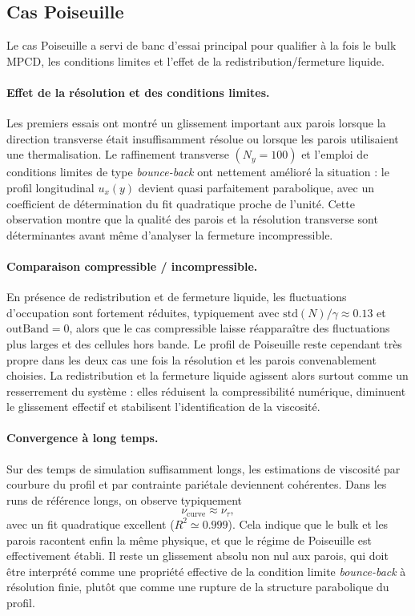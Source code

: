 \documentclass[11pt,a4paper]{article}
\begin{document}
\subsection{Cas Poiseuille}

Le cas Poiseuille a servi de banc d'essai principal pour qualifier à la fois le bulk MPCD, les conditions limites et l'effet de la redistribution/fermeture liquide.

\paragraph{Effet de la résolution et des conditions limites.}
Les premiers essais ont montré un glissement important aux parois lorsque la direction transverse était insuffisamment résolue ou lorsque les parois utilisaient une thermalisation. Le raffinement transverse \((N_y=100)\) et l'emploi de conditions limites de type \emph{bounce-back} ont nettement amélioré la situation : le profil longitudinal \(u_x(y)\) devient quasi parfaitement parabolique, avec un coefficient de détermination du fit quadratique proche de l'unité. Cette observation montre que la qualité des parois et la résolution transverse sont déterminantes avant même d'analyser la fermeture incompressible.

\paragraph{Comparaison compressible / incompressible.}
En présence de redistribution et de fermeture liquide, les fluctuations d'occupation sont fortement réduites, typiquement avec \(\mathrm{std}(N)/\gamma \approx 0.13\) et \(\mathrm{outBand}=0\), alors que le cas compressible laisse réapparaître des fluctuations plus larges et des cellules hors bande. Le profil de Poiseuille reste cependant très propre dans les deux cas une fois la résolution et les parois convenablement choisies. La redistribution et la fermeture liquide agissent alors surtout comme un resserrement du système : elles réduisent la compressibilité numérique, diminuent le glissement effectif et stabilisent l'identification de la viscosité.

\paragraph{Convergence à long temps.}
Sur des temps de simulation suffisamment longs, les estimations de viscosité par courbure du profil et par contrainte pariétale deviennent cohérentes. Dans les runs de référence longs, on observe typiquement
\begin{equation}
 \nu_{\mathrm{curve}} \approx \nu_{\tau},
\end{equation}
avec un fit quadratique excellent (\(R^2 \simeq 0.999\)). Cela indique que le bulk et les parois racontent enfin la même physique, et que le régime de Poiseuille est effectivement établi. Il reste un glissement absolu non nul aux parois, qui doit être interprété comme une propriété effective de la condition limite \emph{bounce-back} à résolution finie, plutôt que comme une rupture de la structure parabolique du profil.
\end{document}
